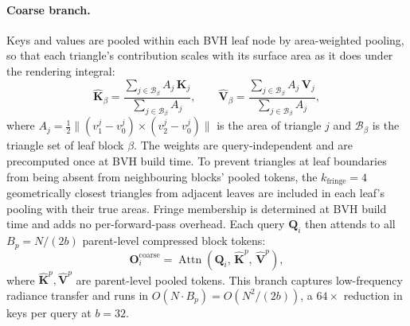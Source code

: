 \documentclass{egpubl}
\begin{document}
\paragraph{Coarse branch.}
Keys and values are pooled within each BVH leaf node by area-weighted
pooling, so that each triangle's contribution scales with its surface
area as it does under the rendering integral:
\begin{equation}
  \hat{\mathbf{K}}_\beta =
    \frac{\sum_{j \in \mathcal{B}_\beta} A_j\,\mathbf{K}_j}
         {\sum_{j \in \mathcal{B}_\beta} A_j},
  \qquad
  \hat{\mathbf{V}}_\beta =
    \frac{\sum_{j \in \mathcal{B}_\beta} A_j\,\mathbf{V}_j}
         {\sum_{j \in \mathcal{B}_\beta} A_j},
  \label{eq:coarse_pool}
\end{equation}
where $A_j = \tfrac{1}{2}\|(v_1^j{-}v_0^j)\times(v_2^j{-}v_0^j)\|$ is
the area of triangle $j$ and $\mathcal{B}_\beta$ is the triangle set of
leaf block $\beta$.
The weights are query-independent and are precomputed once at BVH build time.
To prevent triangles at leaf boundaries from being absent from neighbouring
blocks' pooled tokens, the $k_\text{fringe} = 4$ geometrically closest
triangles from adjacent leaves are included in each leaf's pooling with
their true areas.
Fringe membership is determined at BVH build time and adds no per-forward-pass
overhead.
Each query $\mathbf{Q}_i$ then attends to all $B_p = N/(2b)$ parent-level
compressed block tokens:
\begin{equation}
  \mathbf{O}_i^\text{coarse} =
    \operatorname{Attn}(\mathbf{Q}_i,\, \hat{\mathbf{K}}^p,\, \hat{\mathbf{V}}^p),
\end{equation}
where $\hat{\mathbf{K}}^p, \hat{\mathbf{V}}^p$ are parent-level pooled tokens.
This branch captures low-frequency radiance transfer and runs in
$O(N \cdot B_p) = O(N^2 / (2b))$, a $64\times$ reduction in keys per
query at $b = 32$.
\end{document}
